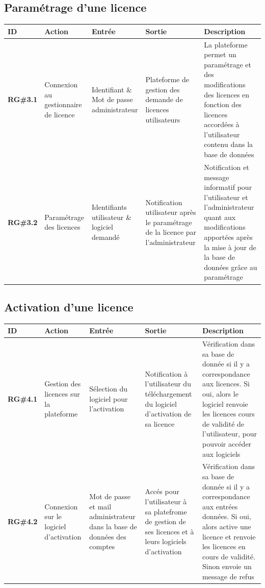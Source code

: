 \newpage
\subsection{Paramétrage d'une licence}

\begin{table}[!h] %
    \small
    \begin{tabular}{|m{1.5cm}|m{1.9cm}|m{2.5cm}|m{2.5cm}|m{7cm}|} 
	\hline
	    \textbf{ID} & \textbf{Action} & \textbf{Entrée} & \textbf{Sortie} & \textbf{Description} \\
	\hline
	    \textbf{RG\#3.1} & Connexion au gestionnaire de licence & Identifiant \& Mot de passe administrateur & Plateforme de gestion  des demande de licences utilisateurs & La plateforme permet un paramétrage et des modifications des licences en fonction des licences accordées à l'utilisateur contenu dans la base de données\\
	\hline
	    \textbf{RG\#3.2} & Paramétrage  des licences& Identifiants utilisateur \&  logiciel demandé & Notification utilisateur après le paramétrage de la licence par l'administrateur & Notification et message informatif pour l'utilisateur et l'administrateur quant aux modifications apportées après la mise à jour de la base de données grâce au paramétrage\\
	\hline	    
    \end{tabular}
\end{table}

\subsection{Activation d'une licence}

\begin{table}[!h] %
    \small
    \begin{tabular}{|m{1.5cm}|m{1.9cm}|m{2.5cm}|m{2.5cm}|m{7cm}|} 
	\hline
	    \textbf{ID} & \textbf{Action} & \textbf{Entrée} & \textbf{Sortie} & \textbf{Description} \\
	\hline
	    \textbf{RG\#4.1} & Gestion des licences sur la plateforme & Sélection du logiciel pour l'activation & Notification à l'utilisateur du téléchargement du logiciel d'activation de sa licence & Vérification dans sa base de donnée si il y a correspondance aux licences. Si oui, alors le logiciel renvoie les licences cours de validité de l'utilisateur, pour pouvoir accéder aux logiciels \\ 
	\hline
	    \textbf{RG\#4.2} & Connexion sur  le logiciel  d'activation &  Mot de passe et mail administrateur dans la base de données des comptes & Accés pour l'utilisateur à sa platefrome de gestion de ses licences et à leurs logiciels d'activation & Vérification dans sa base de donnée si il y a correspondance aux entrées données. Si oui, alors active une licence et renvoie les licences en cours de validité. Sinon envoie un message de refus \\ 
	\hline
    \end{tabular}
\end{table}
